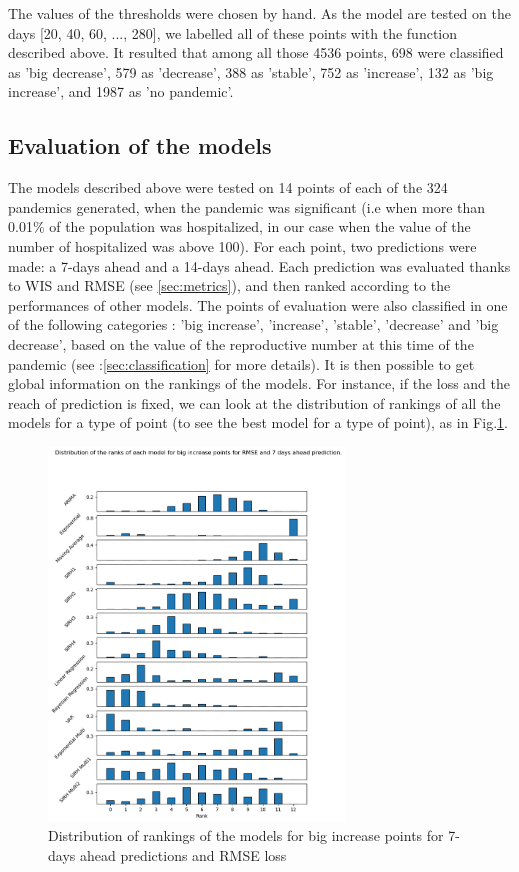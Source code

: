 The values of the thresholds were chosen by hand. 
As the model are tested on the days [20, 40, 60, ..., 280], we labelled all of these points with the function described above. 
It resulted that among all those 4536 points, 698 were classified as 'big decrease', 579 as 'decrease', 388 as 'stable', 752 as 'increase',  132 as 'big increase', and 1987 as 'no pandemic'.



\subsection{Evaluation of the models}

The models described above were tested on 14 points of each of the 324 pandemics generated, when the pandemic was significant (i.e when more than 0.01\% of the population was hospitalized, in our case when the value of the number of hospitalized was above 100). 
For each point, two  predictions were made:  a 7-days ahead and a 14-days ahead. 
Each prediction was evaluated thanks to WIS and RMSE (see \ref{sec:metrics}), and then ranked according to the performances of other models.
The points of evaluation were also classified in one of the following categories : 'big increase', 'increase', 'stable', 'decrease' and 'big decrease', based on the value of the reproductive number at this time of the pandemic (see :\ref{sec:classification} for more details). 
It is then possible to get global information on the rankings of the models. 
For instance, if the loss and the reach of prediction is fixed, we can look at the distribution of rankings of all the models for a type of point (to see the best model for a type of point), as in Fig.\ref{fig:rankings}.
\begin{figure}[h]
    \centering
    \includegraphics[width=0.7\textwidth]{figures/ranks_big_increase_RMSE_7.png}
    \caption{Distribution of rankings of the models for big increase points for 7-days ahead predictions and RMSE loss}
    \label{fig:rankings}
\end{figure}
